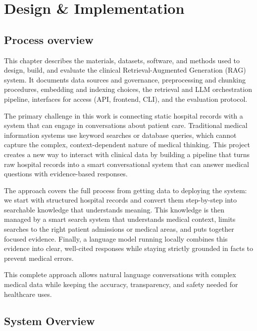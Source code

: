 \chapter{Design \& Implementation}

\section{Process overview}
This chapter describes the materials, datasets, software, and methods used to design, build, and evaluate the clinical Retrieval-Augmented Generation (RAG) system. It documents data sources and governance, preprocessing and chunking procedures, embedding and indexing choices, the retrieval and LLM orchestration pipeline, interfaces for access (API, frontend, CLI), and the evaluation protocol.

The primary challenge in this work is connecting static hospital records with a system that can engage in conversations about patient care. Traditional medical information systems use keyword searches or database queries, which cannot capture the complex, context-dependent nature of medical thinking. This project creates a new way to interact with clinical data by building a pipeline that turns raw hospital records into a smart conversational system that can answer medical questions with evidence-based responses.


The approach covers the full process from getting data to deploying the system: we start with structured hospital records and convert them step-by-step into searchable knowledge that understands meaning. This knowledge is then managed by a smart search system that understands medical context, limits searches to the right patient admissions or medical areas, and puts together focused evidence. Finally, a language model running locally combines this evidence into clear, well-cited responses while staying strictly grounded in facts to prevent medical errors.

This complete approach allows natural language conversations with complex medical data while keeping the accuracy, transparency, and safety needed for healthcare uses.

\newpage
\section{System Overview}

